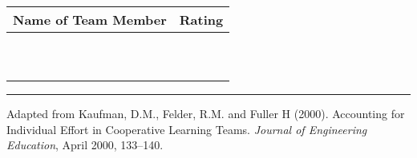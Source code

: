 \documentclass{article}
\begin{document}
\begin{center}
\begin{tabularx}{0.8\textwidth}{>{\RaggedRight\arraybackslash}X|>{\centering\arraybackslash}X}

\textbf{\Large Name of Team Member} & \textbf{\Large Rating} \\
\hline
\vspace{1.5em} & \\ \\
\hline
\vspace{1.5em} & \\ \\
\hline
\vspace{1.5em} & \\ \\
\hline
\vspace{1.5em} & \\ \\
\hline
\vspace{1.5em} & \\ \\
\hline
\end{tabularx}
\end{center}

\vspace{1cm}

\hrule

\vspace{0.2cm}

\noindent * Adapted from Kaufman, D.M., Felder, R.M. and Fuller H (2000). Accounting for Individual Effort in Cooperative Learning Teams. \textit{Journal of Engineering Education}, April 2000, 133–140.
\end{document}
